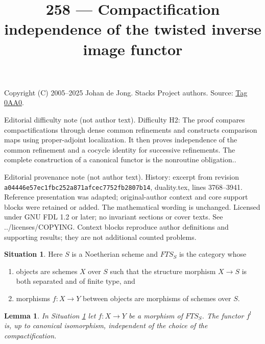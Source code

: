 \documentclass{amsart}
\theoremstyle{plain}
\newtheorem{lemma}[subsection]{Lemma}
\theoremstyle{definition}
\newtheorem{situation}[subsection]{Situation}
\theoremstyle{remark}
\numberwithin{equation}{subsection}
\begin{document}
\title[Stacks Project, Tag 0AA0]{258 --- Compactification independence of the twisted inverse image functor}
\maketitle
\noindent Copyright (C) 2005--2025 Johan de Jong. Stacks Project authors. Source: \href{https://stacks.math.columbia.edu/tag/0AA0}{Tag 0AA0}.

\noindent Editorial difficulty note (not author text). Difficulty H2: The proof compares compactifications through dense common refinements and constructs comparison maps using proper-adjoint localization. It then proves independence of the common refinement and a cocycle identity for successive refinements. The complete construction of a canonical functor is the nonroutine obligation..

\noindent Editorial provenance note (not author text). History: excerpt from revision \texttt{a0444\allowbreak 6e57e\allowbreak c1fbc\allowbreak 252a8\allowbreak 71afc\allowbreak ec775\allowbreak 2fb28\allowbreak 07b14}, duality.tex, lines 3768--3941. Reference presentation was adapted; original-author context and core support blocks were retained or added. The mathematical wording is unchanged. Licensed under GNU FDL 1.2 or later; no invariant sections or cover texts. See ../licenses/COPYING. Context blocks reproduce author definitions and supporting results; they are not additional counted problems.

\begin{situation}
\label{situation-shriek}
Here $S$ is a Noetherian scheme and $\textit{FTS}_S$ is the category whose
\begin{enumerate}
\item objects are schemes $X$ over $S$ such that the structure
morphism $X \to S$ is both separated and of finite type, and
\item morphisms $f : X \to Y$ between objects are morphisms
of schemes over $S$.
\end{enumerate}
\end{situation}

\begin{lemma}
\label{lemma-shriek-well-defined}
In Situation \ref{situation-shriek} let $f : X \to Y$ be a morphism
of $\textit{FTS}_S$. The functor $f^!$ is, up to canonical isomorphism,
independent of the choice of the compactification.
\end{lemma}
\end{document}
